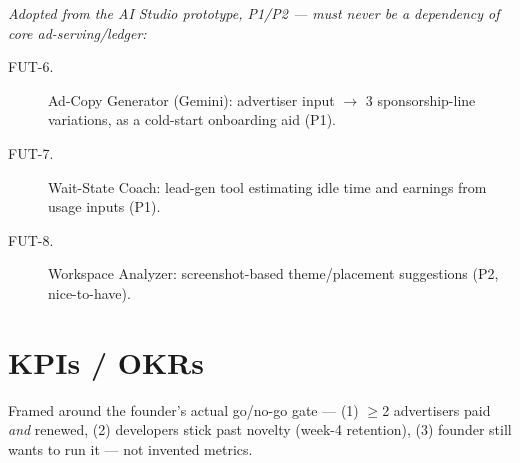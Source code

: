 \emph{Adopted from the AI Studio prototype, P1/P2 \cite{masterplan_2026} --- must never be a dependency of core ad-serving/ledger:}
\begin{description}
\item[FUT-6.] Ad-Copy Generator (Gemini): advertiser input $\to$ 3 sponsorship-line variations, as a cold-start onboarding aid (P1).
\item[FUT-7.] Wait-State Coach: lead-gen tool estimating idle time and earnings from usage inputs (P1).
\item[FUT-8.] Workspace Analyzer: screenshot-based theme/placement suggestions (P2, nice-to-have).
\end{description}

\section{KPIs / OKRs}
\label{sec:kpis-okrs}

Framed around the founder's actual go/no-go gate \cite{masterplan_2026} --- (1) $\geq$2 advertisers paid \emph{and} renewed, (2) developers stick past novelty (week-4 retention), (3) founder still wants to run it --- not invented metrics.

